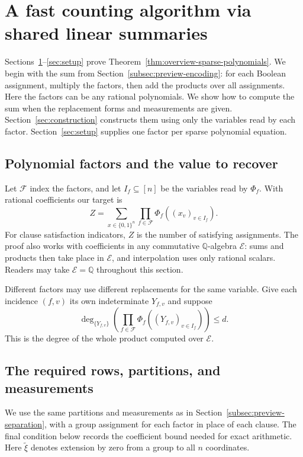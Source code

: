 \section{A fast counting algorithm via shared linear summaries}\label{sec:counting}
Sections~\ref{sec:counting}--\ref{sec:setup} prove
Theorem~\ref{thm:overview-sparse-polynomials}. We begin with the sum
from Section~\ref{subsec:preview-encoding}: for each Boolean assignment,
multiply the factors, then add the products over all assignments.
Here the factors can be any rational polynomials. We show how to
compute the sum when the replacement forms and measurements are given.
Section~\ref{sec:construction} constructs them using only the variables
read by each factor. Section~\ref{sec:setup} supplies one factor per
sparse polynomial equation.

\subsection{Polynomial factors and the value to recover}
\label{subsec:product-interface}
Let $\mathcal F$ index the factors, and let $I_f\subseteq[n]$ be the
variables read by $\Phi_f$. With rational coefficients our target is
\begin{equation}\label{eq:general-product-sum}
 Z=\sum_{x\in\{0,1\}^n}\prod_{f\in\mathcal F}\Phi_f((x_v)_{v\in I_f}).
\end{equation}
For clause satisfaction indicators, $Z$ is the number of satisfying
assignments. The proof also works with coefficients in any commutative
$\mathbb Q$-algebra $\mathcal E$: sums and products then take place in
$\mathcal E$, and interpolation uses only rational scalars. Readers may
take $\mathcal E=\mathbb Q$ throughout this section.

Different factors may use different replacements for the same variable.
Give each incidence $(f,v)$ its own indeterminate $Y_{f,v}$ and suppose
\begin{equation}\label{eq:general-product-degree}
 \deg_{\{Y_{f,v}\}}\!
    \left(\prod_{f\in\mathcal F}\Phi_f((Y_{f,v})_{v\in I_f})\right)\le d .
\end{equation}
This is the degree of the whole product computed over $\mathcal E$.
\subsection{The required rows, partitions, and measurements}
\label{subsec:layout-interface}
We use the same partitions and measurements as in Section~\ref{subsec:preview-separation},
with a group assignment for each factor in place of each clause.
The final condition below records the coefficient bound needed for
exact arithmetic. Here $\widetilde\xi$ denotes extension by zero
from a group to all $n$ coordinates.

